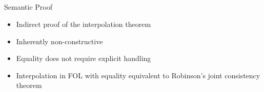 \documentclass[final,compress]{beamer}
\begin{document}
\subsection{}
\begin{frame}{Semantic Proof}
	\begin{itemize}
		\item Indirect proof of the interpolation theorem

		\item Inherently non-constructive 

		\item Equality does not require explicit handling

		\item Interpolation in FOL with equality equivalent to Robinson's joint consistency theorem

	\end{itemize}




\end{frame}
\end{document}
